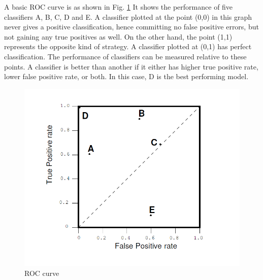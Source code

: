 \documentclass[a4paper,10pt]{report}\usepackage[]{graphicx}\usepackage[]{color}
\begin{document}
A basic ROC curve is as shown in Fig. \ref{roc} It shows the performance of five classifiers A, B, C, D and E. A classifier plotted at the point (0,0) in this graph never  gives a positive classification, hence committing no false positive errors, but not gaining any true positives as well. On the other hand, the point (1,1) represents the opposite kind of strategy. A classifier plotted at (0,1) has perfect classification. The performance of classifiers can be measured relative to these points. A classifier is better than another if it either has higher true positive rate, lower false positive rate, or both. In this case, D is the best performing model.   
\begin{figure}[h]
  \begin{center}
    \includegraphics[scale=0.3]{roc-curve}
    \caption{ROC curve} \label{roc}
  \end{center}
\end{figure}
\end{document}
